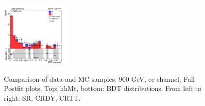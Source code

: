 \begin{figure}[tbp]
\begin{center}
    \includegraphics[width=0.31\textwidth]{figures/ee_900_july20/bdt_response_ee_CRTT_FullPostfit_plot_july20.png}\\
    \caption{Comparison of data and MC samples. 900 GeV, ee channel, Full Postfit plots. Top: hhMt, bottom: BDT distributions. From left to right: SR, CRDY, CRTT.}
    \label{fig:MCcomparison_ee_900}
  \end{center}
\end{figure}



